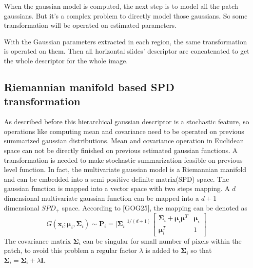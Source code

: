 When the gaussian model is computed, the next step is to model all the patch gaussians. But it's a complex problem to directly model those gaussians. So some transformation will be operated on estimated parameters.

With the Gaussian parameters extracted in each region, the same transformation is operated on them. Then all horizontal slides' descriptor are concatenated to get the whole descriptor for the whole image.

\subsection{Riemannian manifold based SPD transformation}

As described before this hierarchical gaussian descriptor is a stochastic feature, so operations like computing mean and covariance need to be operated on previous summarized gaussian distributions. Mean and covariance operation in Euclidean space can not be directly finished on previous estimated gaussian functions. A transformation is needed to make stochastic summarization feasible on previous level function.
In fact, the multivariate gaussian model is a Riemannian manifold and can be embedded into a semi positive definite matrix(SPD) space. The gaussian function is mapped into a vector space with two steps mapping. A $d$ dimensional multivariate gaussian function can be mapped into a $d+1$ dimensional $SPD_+$ space. According to [GOG25], the mapping can be denoted as 
\begin{equation}
G(\bm{x}_i;\bm{\mu}_i,\bm{\Sigma}_i) \sim \bm{P}_i  = |\bm{\Sigma}_i|^{1/(d+1)} \left[ \begin{matrix}
\bm{\Sigma}_i + \bm{\mu}_i\bm{\mu}^T & \bm{\mu}_i \\
\bm{\mu}_i^T & 1
\end{matrix}
\right]
\end{equation}
The covariance matrix $\bm{\Sigma}_i$ can be singular for small number of pixels within the patch, to avoid this problem a regular factor $\lambda$ is added to $\bm{\Sigma}_i$ so that $\bm{\Sigma}_i = \bm{\Sigma}_i + \lambda\bm{I}$. 

